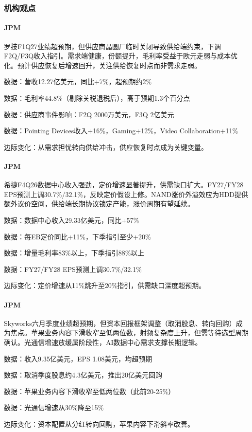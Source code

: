 \documentclass[11pt]{ctexart}
\begin{document}
\subsubsection*{机构观点}
\paragraph{JPM} 罗技F1Q27业绩超预期，但供应商晶圆厂临时关闭导致供给端约束，下调F2Q/F3Q收入指引。需求端健康，份额提升，毛利率受益于欧元走弱与成本优化。预计供应恢复后增速回升，关注供给恢复时点而非需求走弱。
{\small\color{refgray}数据：营收12.27亿美元，同比+7\%，超预期约2\%\par}
{\small\color{refgray}数据：毛利率44.8\%（剔除关税退税后），高于预期1.3个百分点\par}
{\small\color{refgray}数据：供应商事件影响：F2Q 2000万美元，F3Q 2亿美元\par}
{\small\color{refgray}数据：Pointing Devices收入+16\%，Gaming+12\%，Video Collaboration+11\%\par}
{\small\color{refgray}边际变化：从需求担忧转向供给冲击，供应恢复时点成为关键变量。\par}
\paragraph{JPM} 希捷F4Q26数据中心收入强劲，定价增速显著提升，供需缺口扩大。FY27/FY28 EPS预测上调30.7\%/32.1\%，反映定价假设上修。NAND涨价外溢效应为HDD提供额外议价空间，供给端长期协议锁定产能，涨价周期有望延续。
{\small\color{refgray}数据：数据中心收入29.33亿美元，同比+57\%\par}
{\small\color{refgray}数据：每EB定价同比+11\%，下季指引至少+20\%\par}
{\small\color{refgray}数据：增量毛利率83\%以上，下季指引88\%以上\par}
{\small\color{refgray}数据：FY27/FY28 EPS预测上调30.7\%/32.1\%\par}
{\small\color{refgray}边际变化：定价增速从11\%跳升至20\%指引，供需缺口深度超预期。\par}
\paragraph{JPM} Skyworks六月季度业绩超预期，但资本回报框架调整（取消股息、转向回购）成为焦点。苹果业务内容下滑收窄至低两位数，射频复杂度上升，但需等待选型周期确认。光通信增速放缓属阶段性，AI数据中心需求支撑长期逻辑。
{\small\color{refgray}数据：收入9.35亿美元，EPS 1.08美元，均超预期\par}
{\small\color{refgray}数据：取消季度股息约4.3亿美元，推出20亿美元回购\par}
{\small\color{refgray}数据：苹果业务内容下滑收窄至低两位数（此前20-25\%）\par}
{\small\color{refgray}数据：光通信增速从30\%降至15\%\par}
{\small\color{refgray}边际变化：资本配置从分红转向回购，苹果内容下滑斜率改善。\par}
\end{document}
